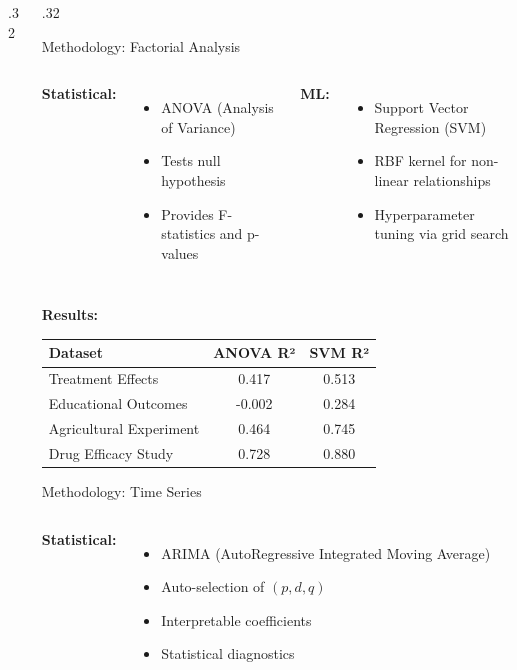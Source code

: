 \documentclass[final]{beamer}
\begin{document}
\begin{frame}[t]
\begin{columns}[t]
\begin{column}{.32\linewidth}
\end{column}

\begin{column}{.32\linewidth}

\begin{block}{Methodology: Factorial Analysis}
\begin{columns}[t]
\textcolor{statcolor}{\textbf{Statistical:}}
\begin{itemize}
    \item ANOVA (Analysis of Variance)
    \item Tests null hypothesis
    \item Provides F-statistics and p-values
\end{itemize}

\textcolor{mlcolor}{\textbf{ML:}}
\begin{itemize}
    \item Support Vector Regression (SVM)
    \item RBF kernel for non-linear relationships
    \item Hyperparameter tuning via grid search
\end{itemize}
\end{columns}

\vspace{0.3cm}
\textbf{Results:}
\begin{center}
\small
\begin{tabular}{lcc}
\toprule
\textbf{Dataset} & \textbf{ANOVA R²} & \textbf{SVM R²} \\
\midrule
Treatment Effects & 0.417 & \textcolor{mlcolor}{0.513} \\
Educational Outcomes & -0.002 & \textcolor{mlcolor}{0.284} \\
Agricultural Experiment & 0.464 & \textcolor{mlcolor}{0.745} \\
Drug Efficacy Study & 0.728 & \textcolor{mlcolor}{0.880} \\
\bottomrule
\end{tabular}
\end{center}
\end{block}

\begin{block}{Methodology: Time Series}
\begin{columns}[t]
\textcolor{statcolor}{\textbf{Statistical:}}
\begin{itemize}
    \item ARIMA (AutoRegressive Integrated Moving Average)
    \item Auto-selection of $(p,d,q)$
    \item Interpretable coefficients
    \item Statistical diagnostics
\end{itemize}


\end{columns}
\end{block}
\end{column}
\end{columns}
\end{frame}
\end{document}
